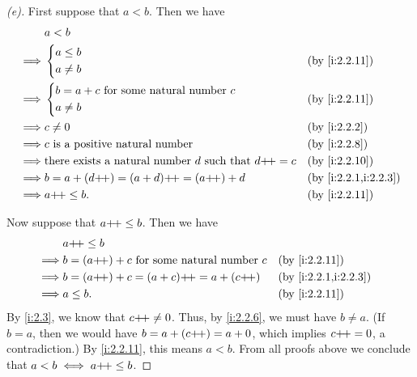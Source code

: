\begin{proof}[(e)]
  First suppose that \(a < b\).
  Then we have
  \begin{align*}
             & a < b                                                                                         \\
    \implies & \begin{dcases}
                 a \leq b \\
                 a \neq b
               \end{dcases}                                                      &  & \by{i:2.2.11}          \\
    \implies & \begin{dcases}
                 b = a + c \text{ for some natural number } c \\
                 a \neq b
               \end{dcases}                     &  & \by{i:2.2.11}                                           \\
    \implies & c \neq 0                                                            &  & \by{i:2.2.2}         \\
    \implies & c \text{ is a positive natural number}                              &  & \by{i:2.2.8}         \\
    \implies & \text{there exists a natural number } d \text{ such that } d\pp = c &  & \by{i:2.2.10}        \\
    \implies & b = a + (d\pp) = (a + d)\pp = (a\pp) + d                            &  & \by{i:2.2.1,i:2.2.3} \\
    \implies & a\pp \leq b.                                                        &  & \by{i:2.2.11}
  \end{align*}

  Now suppose that \(a{+}\!{+} \leq b\).
  Then we have
  \begin{align*}
             & a\pp \leq b                                                                 \\
    \implies & b = (a\pp) + c \text{ for some natural number } c &  & \by{i:2.2.11}        \\
    \implies & b = (a\pp) + c = (a + c)\pp = a + (c\pp)          &  & \by{i:2.2.1,i:2.2.3} \\
    \implies & a \leq b.                                         &  & \by{i:2.2.11}
  \end{align*}
  By \cref{i:2.3}, we know that \(c{+}\!{+} \neq 0\).
  Thus, by \cref{i:2.2.6}, we must have \(b \neq a\).
  (If \(b = a\), then we would have \(b = a + (c{+}\!{+}) = a + 0\), which implies \(c{+}\!{+} = 0\), a contradiction.)
  By \cref{i:2.2.11}, this means \(a < b\).
  From all proofs above we conclude that \(a < b \iff a{+}\!{+} \leq b\).
\end{proof}

